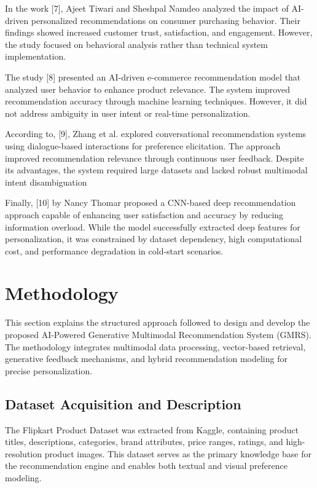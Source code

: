 \documentclass[conference]{IEEEtran}
\begin{document}
In the work [7], Ajeet Tiwari and Sheshpal Namdeo analyzed the impact of AI-driven personalized recommendations on consumer purchasing behavior. Their findings showed increased customer trust, satisfaction, and engagement. However, the study focused on behavioral analysis rather than technical system implementation. \par

The study [8] presented an AI-driven e-commerce recommendation model that analyzed user behavior to enhance product relevance. The system improved recommendation accuracy through machine learning techniques. However, it did not address ambiguity in user intent or real-time personalization. \par

According to, [9], Zhang et al. explored conversational recommendation systems using dialogue-based interactions for preference elicitation. The approach improved recommendation relevance through continuous user feedback. Despite its advantages, the system required large datasets and lacked robust multimodal intent disambiguation \par

Finally, [10] by Nancy Thomar proposed a CNN-based
deep recommendation approach capable of enhancing
user satisfaction and accuracy by reducing information
overload. While the model successfully extracted deep
features for personalization, it was constrained by dataset
dependency, high computational cost, and performance
degradation in cold-start scenarios.

\section{Methodology}

This section explains the structured approach followed to
design and develop the proposed AI-Powered Generative
Multimodal Recommendation System (GMRS). The
methodology integrates multimodal data processing,
vector-based retrieval, generative feedback mechanisms,
and hybrid recommendation modeling for precise
personalization. 

\subsection{Dataset Acquisition and Description}
The Flipkart Product Dataset was extracted from
Kaggle, containing product titles, descriptions,
categories, brand attributes, price ranges, ratings, and
high-resolution product images. This dataset serves as
the primary knowledge base for the recommendation
engine and enables both textual and visual preference
modeling.
\end{document}
